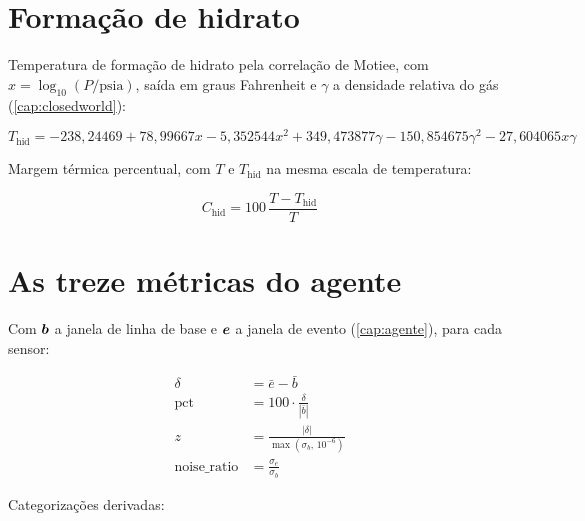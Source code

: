 \section{Formação de hidrato}

Temperatura de formação de hidrato pela correlação de Motiee, com
$x=\log_{10}(P/\mathrm{psia})$, saída em graus Fahrenheit e $\gamma$ a densidade
relativa do gás (\cref{cap:closedworld}):

\begin{equation}
T_{\text{hid}} = -238{,}24469 + 78{,}99667x - 5{,}352544x^2
+ 349{,}473877\gamma - 150{,}854675\gamma^2 - 27{,}604065x\gamma
\label{eq:for-motiee}
\end{equation}

Margem térmica percentual, com $T$ e $T_{\text{hid}}$ na mesma escala de temperatura:

\begin{equation}
C_{\text{hid}} = 100\,\frac{T-T_{\text{hid}}}{T}
\label{eq:for-chid}
\end{equation}

\section{As treze métricas do agente}

Com $\bm{b}$ a janela de linha de base e $\bm{e}$ a janela de evento
(\cref{cap:agente}), para cada sensor:

\begin{align}
\delta &= \bar{e} - \bar{b}
\label{eq:for-delta} \\[0.3em]
\text{pct} &= 100 \cdot \frac{\delta}{|\bar{b}|}
\label{eq:for-pct} \\[0.3em]
z &= \frac{|\delta|}{\max(\sigma_b,\, 10^{-6})}
\label{eq:for-z} \\[0.3em]
\text{noise\_ratio} &= \frac{\sigma_e}{\sigma_b}
\label{eq:for-noise}
\end{align}

Categorizações derivadas:

